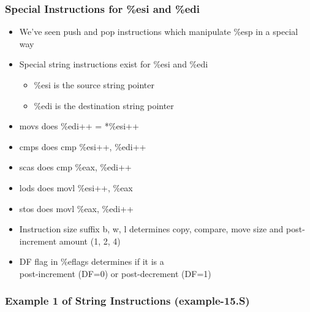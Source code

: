 \documentclass[11pt,xcolor=dvipsnames]{beamer}
\newcommand{\vs}{\vspace{0.5em}}
\newcommand{\mvs}{\vspace{-0.95em}}
\begin{document}
\begin{frame}[fragile,t]
\mvs
\frametitle{Special Instructions for {\ttfamily \%esi} and {\ttfamily \%edi}}
\begin{itemize}
  \item We've seen {\ttfamily push} and {\ttfamily pop} instructions which manipulate {\ttfamily \%esp} in a special way
  \item Special string instructions exist for {\ttfamily \%esi} and {\ttfamily \%edi}
  \begin{itemize}
    \item {\ttfamily \%esi} is the source string pointer
    \item {\ttfamily \%edi} is the destination string pointer
  \end{itemize}
  \pause
  \item {\ttfamily movs} does {\ttfamily *\%edi++ = *\%esi++}
  \item {\ttfamily cmps} does {\ttfamily cmp \%esi++, \%edi++}
  \item {\ttfamily scas} does {\ttfamily cmp \%eax, \%edi++}
  \item {\ttfamily lods} does {\ttfamily movl \%esi++, \%eax}
  \item {\ttfamily stos} does {\ttfamily movl \%eax, \%edi++}
  \pause
  \vs
  \item Instruction size suffix {\ttfamily b, w, l} determines copy, compare, move size and post-increment amount (1, 2, 4)
  \item DF flag in {\ttfamily \%eflags} determines if it is a \\ post-increment (DF=0) or post-decrement (DF=1)
\end{itemize}
\end{frame}

\begin{frame}[fragile,t]
\mvs
\frametitle{Example 1 of String Instructions (example-15.S)}
\end{frame}
\end{document}
